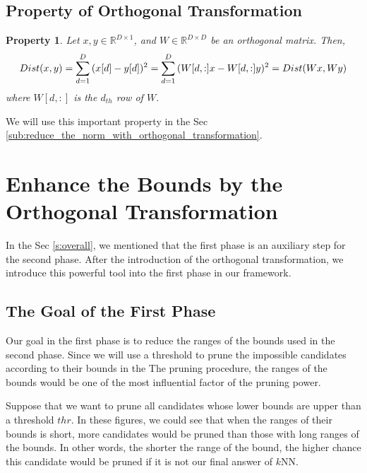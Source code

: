 \subsection{Property of Orthogonal Transformation}
\label{ss:ortho_prop}
\newtheorem{ProOfOrthogonal}{\bf Property}
\begin{ProOfOrthogonal}
Let $x, y\in\mathbb{R}^{D\times 1}$, and $W\in\mathbb{R}^{D\times D}$ be an orthogonal matrix. Then,
\[
Dist(x,y)=\sum^D_{d=1}{(x[d]-y[d])^2} \\
=\sum^D_{d=1}{(W[d,:]x-W[d,:]y)^2}=Dist(Wx,Wy)
\]
where $W[d,:]$ is the $d_{th}$ row of $W$.
\end{ProOfOrthogonal}

We will use this important property in the Sec \ref{sub:reduce_the_norm_with_orthogonal_transformation}.

\section{Enhance the Bounds by the Orthogonal Transformation}
\label{s:ortho_bounds}
In the Sec \ref{s:overall}, we mentioned that the first phase is an auxiliary step for the second phase.  After the introduction of the orthogonal transformation, we introduce this powerful tool into the first phase in our framework.

\subsection{The Goal of the First Phase} %
\label{ss:the_goal_of_the_first_phase}

Our goal in the first phase is to reduce the ranges of the bounds used in the second phase.  Since we will use a threshold to prune the impossible candidates according to their bounds in the The pruning procedure, the ranges of the bounds would be one of the most influential factor of the pruning power.



Suppose that we want to prune all candidates whose lower bounds are upper than a threshold $thr$.  In these figures, we could see that when the ranges of their bounds is short, more candidates would be pruned than those with long ranges of the bounds.  In other words, the shorter the range of the bound, the higher chance this candidate would be pruned if it is not our final answer of $k$NN.


